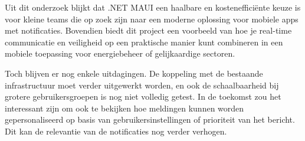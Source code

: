 Uit dit onderzoek blijkt dat .NET MAUI een haalbare en kostenefficiënte keuze is voor kleine teams die op zoek zijn naar een moderne oplossing voor mobiele apps met notificaties. Bovendien biedt dit project een voorbeeld van hoe je real-time communicatie en veiligheid op een praktische manier kunt combineren in een mobiele toepassing voor energiebeheer of gelijkaardige sectoren.

Toch blijven er nog enkele uitdagingen. De koppeling met de bestaande infrastructuur moet verder uitgewerkt worden, en ook de schaalbaarheid bij grotere gebruikersgroepen is nog niet volledig getest. In de toekomst zou het interessant zijn om ook te bekijken hoe meldingen kunnen worden gepersonaliseerd op basis van gebruikersinstellingen of prioriteit van het bericht. Dit kan de relevantie van de notificaties nog verder verhogen.



